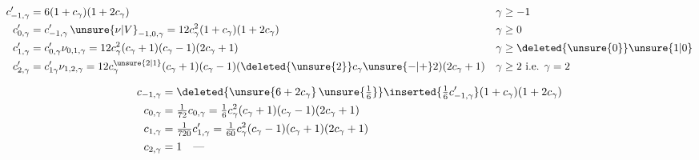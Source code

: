 \[
\begin{aligned}
 c'_{-1,\gamma}&=6(1+c_\gamma)(1+2c_\gamma) &&\gamma\geq-1\\
 c'_{0,\gamma}&=c'_{-1,\gamma}\,{\unsure{\nu|V}}_{-1,0,\gamma}=12c_\gamma^2(1+c_\gamma)(1+2c_\gamma) &&\gamma\geq0\\
 c'_{1,\gamma}&=c'_{0,\gamma}\nu_{0,1,\gamma}=12c_\gamma^2(c_\gamma+1)(c_\gamma-1)(2c_\gamma+1) &&\gamma\geq\deleted{\unsure{0}}\unsure{1|0}\\
 c'_{2,\gamma}&=c'_{1\gamma}\nu_{1,2,\gamma}=12c_\gamma^{\unsure{2|1}}(c_\gamma+1)(c_\gamma-1)(\deleted{\unsure{2}}c_\gamma\unsure{-|+}2)(2c_\gamma+1) &&\gamma\geq2\text{ i.e. }\gamma=2
\end{aligned}
\]

\[
\begin{aligned}
 c_{-1,\gamma}&=\deleted{\unsure{6+2c_\gamma}\,\unsure{\tfrac16}}\inserted{\tfrac16c'_{-1,\gamma}}(1+c_\gamma)(1+2c_\gamma)\\
 c_{0,\gamma}&=\tfrac1{72}c_{0,\gamma}=\tfrac16c_\gamma^2(c_\gamma+1)(c_\gamma-1)(2c_\gamma+1)\\
 c_{1,\gamma}&=\tfrac1{720}c'_{1,\gamma}=\tfrac1{60}c_\gamma^2(c_\gamma-1)(c_\gamma+1)(2c_\gamma+1)\\
 c_{2,\gamma}&=1\quad\text{---}
\end{aligned}
\]


